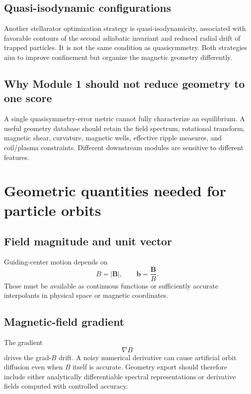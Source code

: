 \subsection{Quasi-isodynamic configurations}
Another stellarator optimization strategy is quasi-isodynamicity, associated with favorable contours of the second adiabatic invariant and reduced radial drift of trapped particles. It is not the same condition as quasisymmetry. Both strategies aim to improve confinement but organize the magnetic geometry differently.

\subsection{Why Module 1 should not reduce geometry to one score}
A single quasisymmetry-error metric cannot fully characterize an equilibrium. A useful geometry database should retain the field spectrum, rotational transform, magnetic shear, curvature, magnetic wells, effective ripple measures, and coil/plasma constraints. Different downstream modules are sensitive to different features.

\section{Geometric quantities needed for particle orbits}
\label{sec:orbit_geometry}

\subsection{Field magnitude and unit vector}
Guiding-center motion depends on
\begin{equation}
B=|\mathbf B|,
\qquad
\mathbf b=\frac{\mathbf B}{B}.
\end{equation}
These must be available as continuous functions or sufficiently accurate interpolants in physical space or magnetic coordinates.

\subsection{Magnetic-field gradient}
The gradient
\begin{equation}
\nabla B
\end{equation}
drives the grad-$B$ drift. A noisy numerical derivative can cause artificial orbit diffusion even when $B$ itself is accurate. Geometry export should therefore include either analytically differentiable spectral representations or derivative fields computed with controlled accuracy.

